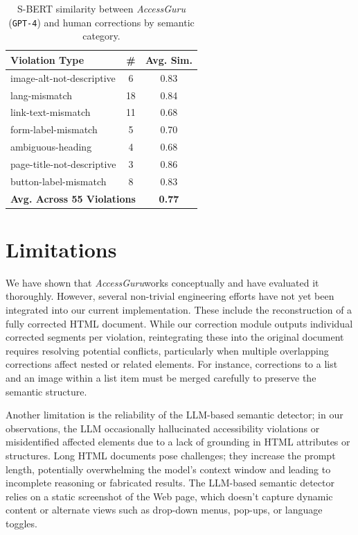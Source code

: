 \documentclass[sigconf, nonacm]{acmart}
\newcommand{\method}{\emph{AccessGuru}}
\begin{document}
\renewcommand{\arraystretch}{1.2}
\begin{table}[h]
\centering
\caption{S-BERT similarity between \method{} (\texttt{GPT-4}) and human corrections by semantic category.}
\label{tab:semantic_similarity}
\small
\begin{tabular}{|p{3.5cm}|c|c|}
\hline
\textbf{Violation Type} & \textbf{\#} & \textbf{Avg. Sim.} \\ \hline
image-alt-not-descriptive     & 6  & 0.83  \\ \hline
lang-mismatch                 & 18 & 0.84  \\ \hline
link-text-mismatch            & 11 & 0.68  \\ \hline
form-label-mismatch           & 5  & 0.70  \\ \hline
ambiguous-heading             & 4  & 0.68  \\ \hline
page-title-not-descriptive    & 3  & 0.86  \\ \hline
button-label-mismatch         & 8  & 0.83  \\ \hline
\multicolumn{2}{|r|}{\textbf{Avg. Across 55 Violations}} & \textbf{0.77} \\ \hline
\end{tabular}
\renewcommand{\arraystretch}{1.0}
\end{table}

\section{Limitations}

We have shown that \method \space works conceptually and have evaluated it thoroughly. However, several non-trivial engineering efforts have not yet been integrated into our current implementation. These include the reconstruction of a fully corrected HTML document. While our correction module outputs individual corrected segments per violation, reintegrating these into the original document requires resolving potential conflicts, particularly when multiple overlapping corrections affect nested or related elements. For instance, corrections to a list and an image within a list item must be merged carefully to preserve the semantic structure. 

Another limitation is the reliability of the LLM-based semantic detector; in our observations, the LLM occasionally hallucinated accessibility violations or misidentified affected elements due to a lack of grounding in HTML attributes or structures. Long HTML documents pose challenges; they increase the prompt length, potentially overwhelming the model's context window and leading to incomplete reasoning or fabricated results. The LLM-based semantic detector relies on a static screenshot of the Web page, which doesn't capture dynamic content or alternate views such as drop-down menus, pop-ups, or language toggles.
\end{document}
